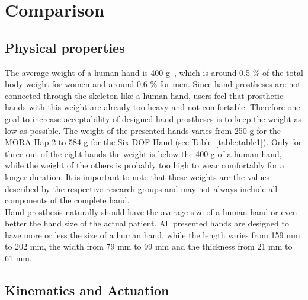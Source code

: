 \documentclass[a4paper, 10pt, conference]{ieeeconf}      %
\begin{document}
\newpage%

\section{Comparison}

\subsection{Physical properties}

The average weight of a human hand is 400 g~\cite{humanbody}, which is around 0.5 $\%$ of the total body weight for women and around 0.6 $\%$ for men. Since hand prostheses are not connected through the skeleton like a human hand, users feel that prosthetic hands with this weight are already too heavy and not comfortable. Therefore one goal to increase acceptability of designed hand prostheses is to keep the weight as low as possible. The weight of the presented hands varies from 250 g for the MORA Hap-2 to 584 g for the Six-DOF-Hand (see Table~\ref{table:table1}). Only for three out of the eight hands the weight is below the 400 g of a human hand, while the weight of the others is probably too high to wear comfortably for a longer duration. It is important to note that these weights are the values described by the respective research groups and may not always include all components of the complete hand.\\
Hand prosthesis naturally should have the average size of a human hand or even better the hand size of the actual patient. All presented hands are designed to have more or less the size of a human hand, while the length varies from 159 mm to 202 mm, the width from 79 mm to 99 mm and the thickness from 21 mm to 61 mm.

\subsection{Kinematics and Actuation}
\end{document}

